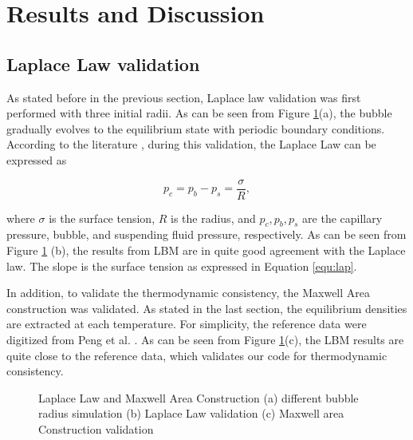 \documentclass[review]{elsarticle}
\begin{document}
\section{Results and Discussion}
\subsection{Laplace Law validation}
As stated before in the previous section, Laplace law validation was first performed with three initial radii. As can be seen from Figure \ref{fig:lap-maxwell}(a), the bubble gradually evolves to the equilibrium state with periodic boundary conditions. According to the literature \cite{porter2012multicomponent,liu2010modified,ezzatneshan2021dynamics}, during this validation, the Laplace Law can be expressed as
\begin{linenomath}
\begin{equation}
	p_c=p_b-p_s=\frac{\sigma}{R},
	\label{equ:lap}
\end{equation}
\end{linenomath}
where $\sigma$ is the surface tension, $R$ is the radius, and $p_c, p_b, p_s$ are the capillary pressure, bubble, and suspending fluid pressure, respectively. As can be seen from Figure \ref{fig:lap-maxwell} (b), the results from LBM are in quite good agreement with the Laplace law. The slope is the surface tension as expressed in Equation \ref{equ:lap}.

In addition, to validate the thermodynamic consistency, the Maxwell Area construction was validated. As stated in the last section, the equilibrium densities are extracted at each temperature. For simplicity, the reference data were digitized from Peng et al. \cite{peng2019simulation}. As can be seen from Figure \ref{fig:lap-maxwell}(c), the LBM results are quite close to the reference data, which validates our code for thermodynamic consistency.
\begin{figure}[htp!]
		\centering
		\setlength{}
		\setlength{}
		
		\caption{Laplace Law and Maxwell Area Construction (a) different bubble radius simulation (b) Laplace Law validation (c) Maxwell area Construction validation}
		\label{fig:lap-maxwell}
\end{figure}
\end{document}
